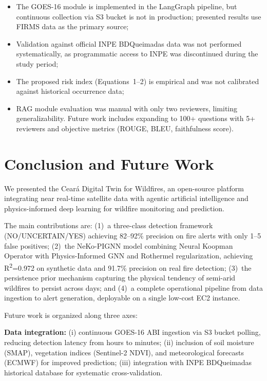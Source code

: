 \documentclass[preprint,times,numbers]{elsarticle}
\begin{document}
\begin{itemize}
    \item The GOES-16 module is implemented in the LangGraph pipeline, but continuous collection via S3 bucket is not in production; presented results use FIRMS data as the primary source;
    \item Validation against official INPE BDQueimadas data was not performed systematically, as programmatic access to INPE was discontinued during the study period;
    \item The proposed risk index (Equations~1--2) is empirical and was not calibrated against historical occurrence data;
    \item RAG module evaluation was manual with only two reviewers, limiting generalizability. Future work includes expanding to 100+ questions with 5+ reviewers and objective metrics (ROUGE, BLEU, faithfulness score).
\end{itemize}

\section{Conclusion and Future Work}
\label{sec:conclusion}

We presented the Cear\'{a} Digital Twin for Wildfires, an open-source platform integrating near real-time satellite data with agentic artificial intelligence and physics-informed deep learning for wildfire monitoring and prediction.

The main contributions are: (1)~a three-class detection framework (NO/UNCERTAIN/YES) achieving 82--92\% precision on fire alerts with only 1--5 false positives; (2)~the NeKo-PIGNN model combining Neural Koopman Operator with Physics-Informed GNN and Rothermel regularization, achieving R\textsuperscript{2}=0.972 on synthetic data and 91.7\% precision on real fire detection; (3)~the persistence prior mechanism capturing the physical tendency of semi-arid wildfires to persist across days; and (4)~a complete operational pipeline from data ingestion to alert generation, deployable on a single low-cost EC2 instance.

Future work is organized along three axes:

\textbf{Data integration:} (i) continuous GOES-16 ABI ingestion via S3 bucket polling, reducing detection latency from hours to minutes; (ii) inclusion of soil moisture (SMAP), vegetation indices (Sentinel-2 NDVI), and meteorological forecasts (ECMWF) for improved prediction; (iii) integration with INPE BDQueimadas historical database for systematic cross-validation.
\end{document}
